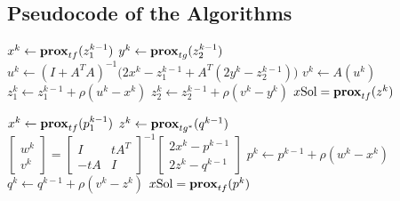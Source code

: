 \documentclass{article}
\theoremstyle{definition}
\theoremstyle{remark}
\begin{document}
\subsection{Pseudocode of the Algorithms}%
\label{sub:pseudo}
\begin{algorithm}[H]
  \label{algo:PRS}

 {
  $x^k \leftarrow \operatorname{\mathbf{prox}}_{tf}(z^{k-1}_1)$  
  $y^k \leftarrow \operatorname{\mathbf{prox}}_{tg}(z^{k-1}_2)$ \;
  $u^k \leftarrow (I+A^TA)^{-1} \big ( 2x^k-z^{k-1}_1 +
  A^T(2y^k-z^{k-1}_2) \big )$ 
  $v^k \leftarrow A(u^k)$ \;
  $z^k_1 \leftarrow z^{k-1}_1 + \rho(u^k-x^k)$ \;
  $z^k_2 \leftarrow z^{k-1}_2 + \rho(v^k-y^k)$ \;
} 
\Return $x\text{Sol} = \operatorname{\mathbf{prox}}_{tf}(z^k)$\;
\caption{Primal Douglas-Rachford Splitting}\label{alg: DRprimal} 
\end{algorithm}
\begin{algorithm}[h!]
  \label{algo:PDRS}
 
  {
   $x^k \leftarrow \operatorname{\mathbf{prox}}_{tf}(p^{k-1}_1)$  
   $z^k \leftarrow \operatorname{\mathbf{prox}}_{tg^*}(q^{k-1})$ \;
   $\begin{bmatrix} w^k\\ v^k  \end{bmatrix} = \begin{bmatrix} I &
    t A^T\\ -t A & I \end{bmatrix}^{-1} \begin{bmatrix}
     2x^k-p^{k-1}\\ 2z^k-q^{k-1} \end{bmatrix} $  
   $p^k \leftarrow p^{k-1} + \rho(w^k-x^k)$ \;
   $q^k \leftarrow q^{k-1} + \rho(v^k-z^k)$ \;
 } 
 \Return $x\text{Sol} = \operatorname{\mathbf{prox}}_{tf}(p^k)$\;
 \caption{Primal-Dual Douglas-Rachford Splitting}\label{alg: DRpd} 
 \end{algorithm}
\end{document}
